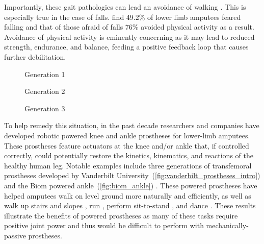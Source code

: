 Importantly, these gait pathologies can lead an avoidance of walking
\citep{gauthier1999enabling}. This is especially true in the case of falls.
\citet{miller2001prevalence} find 49.2\% of lower limb amputees feared falling
and that of those afraid of falls 76\% avoided physical activity as a result.
Avoidance of physical activity is eminently concerning as it may lead to reduced
strength, endurance, and balance, feeding a positive feedback loop that causes
further debilitation.
\begin{figure*}[b]
    \centering
	\begin{subfigure}[b]{0.3\textwidth}
    	\centering
        \caption{Generation 1}
	\end{subfigure}
	\begin{subfigure}[b]{0.3\textwidth}
    	\centering
        \caption{Generation 2}
	\end{subfigure}
	\begin{subfigure}[b]{0.3\textwidth}
    	\centering
        \caption{Generation 3}
	\end{subfigure}
    \caption{Vanderbilt University's Robotic Transfemoral
    Prostheses.\vspace{0.1in}}
    \label{fig:vanderbilt_prostheses_intro}
\end{figure*}

To help remedy this situation, in the past decade researchers and companies have
developed robotic powered knee and ankle prostheses for lower-limb amputees.
These prostheses feature actuators at the knee and/or ankle that, if controlled
correctly, could potentially restore the kinetics, kinematics, and reactions
of the healthy human leg. Notable examples include three generations of
transfemoral prostheses developed by Vanderbilt
University~(\cref{fig:vanderbilt_prostheses_intro}) \citep{sup2009preliminary,
lawson2013control, lawson2014robotic} and the Biom powered
ankle~(\cref{fig:biom_ankle}) \citep{herr2012bionic}. These powered prostheses
have helped amputees walk on level ground more naturally and efficiently, as
well as walk up stairs and slopes \citep{sup2011upslope, lawson2013control}, run
\citep{huff2012running, shultz2015running}, perform sit-to-stand
\citep{varol2009powered}, and dance \citep{rouse2015design}. These results
illustrate the benefits of powered prostheses as many of these tasks require
positive joint power and thus would be difficult to perform with
mechanically-passive prostheses.

